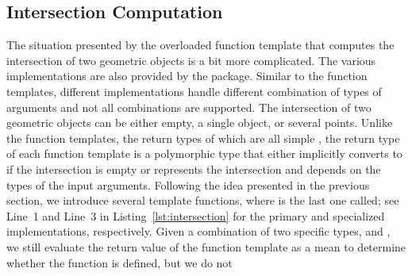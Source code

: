 
\subsection{Intersection Computation}
\label{sec:code:intersectionComputation}
The situation presented by the overloaded function template
 that 
computes the intersection of two geometric objects is a bit more 
complicated. The various implementations are also provided by the 
\iiDandiiiDGeometryKernelPackage{} package. Similar to the 
 function templates, different 
implementations handle different combination of types of arguments
and not all combinations are supported. The intersection of two 
geometric objects can be either empty, a single object, or several
points. Unlike the  function 
templates, the return types of which are all simple 
, the return type of each 
 function template is a
polymorphic type that either implicitly converts to 
 if the intersection is empty or represents the 
intersection and depends on the types of the input arguments. 
Following the idea presented in the previous section, we introduce several 
template functions, where  is 
the last one called; see Line~1 and Line~3 in 
Listing~\ref{lst:intersection} for the primary and specialized 
implementations, respectively. Given a combination of 
two specific types,  and , we still 
evaluate the return value of the function template 
as a mean to determine whether the function is defined, but we do not 
